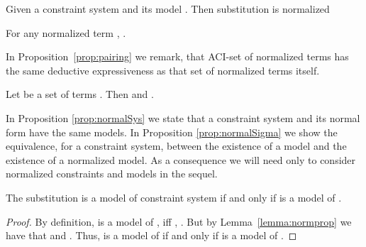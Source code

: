 \begin{lemma}\label{lemma:normalsigma}
Given a  constraint system  and its model . Then 
substitution  is normalized 
\end{lemma}



\begin{lemma}\label{lemma:DAGvsQuasi}
 For any normalized term , .
\end{lemma}


In Proposition~\ref{prop:pairing} we remark, that ACI-set 
of normalized terms has the same deductive expressiveness as that set of normalized terms itself.

\begin{prop}\label{prop:pairing}
Let  be a set of terms . Then  and  .


\end{prop}




In Proposition \ref{prop:normalSys}  we state that a  constraint system and its normal form have the same models. 
In Proposition \ref{prop:normalSigma} we show the equivalence, for a constraint system,  
between the existence of a model and the existence of a  normalized model. 
As a consequence we will need  only to consider  normalized constraints and models in the sequel.

\begin{prop}\label{prop:normalSys}
	The substitution  is a model of constraint system  if and only if  is a model of .
\begin{proof}
	By definition, 
	 is a model of , 
	iff , . 
	But by Lemma~\ref{lemma:normprop} we have that   and . 
	Thus,  is a model of  if and only if  is a model of .
\end{proof}

\end{prop}



